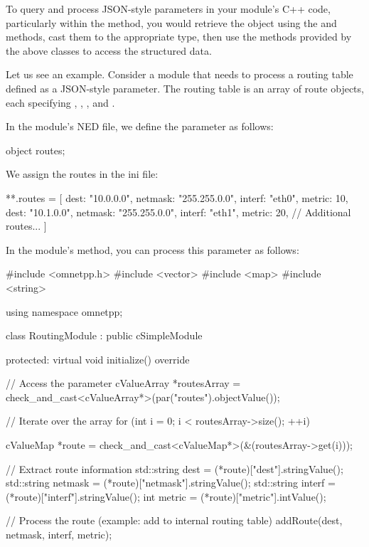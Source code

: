 \begin{ned}
To query and process JSON-style parameters in your module's C++ code,
particularly within the  method, you would retrieve the object
using the  and  methods, cast them to the
appropriate type, then use the methods provided by the above classes to access
the structured data.

Let us see an example. Consider a module that needs to process a routing table
defined as a JSON-style parameter. The routing table is an array of route
objects, each specifying , , , and
.

In the module's NED file, we define the parameter as follows:

\begin{ned}
  object routes;
\end{ned}

We assign the routes in the ini file:

\begin{inifile}
**.routes = [
        {dest: "10.0.0.0", netmask: "255.255.0.0", interf: "eth0", metric: 10},
        {dest: "10.1.0.0", netmask: "255.255.0.0", interf: "eth1", metric: 20},
        // Additional routes...
    ]
\end{inifile}

In the module's  method, you can process this parameter as follows:

\begin{cpp}
#include <omnetpp.h>
#include <vector>
#include <map>
#include <string>

using namespace omnetpp;

class RoutingModule : public cSimpleModule {
protected:
    virtual void initialize() override {
        // Access the parameter
        cValueArray *routesArray = check_and_cast<cValueArray*>(par("routes").objectValue());

        // Iterate over the array
        for (int i = 0; i < routesArray->size(); ++i) {
            cValueMap *route = check_and_cast<cValueMap*>(&(routesArray->get(i)));

            // Extract route information
            std::string dest = (*route)["dest"].stringValue();
            std::string netmask = (*route)["netmask"].stringValue();
            std::string interf = (*route)["interf"].stringValue();
            int metric = (*route)["metric"].intValue();

            // Process the route (example: add to internal routing table)
            addRoute(dest, netmask, interf, metric);
        }
    }

}
\end{cpp}
\end{ned}
